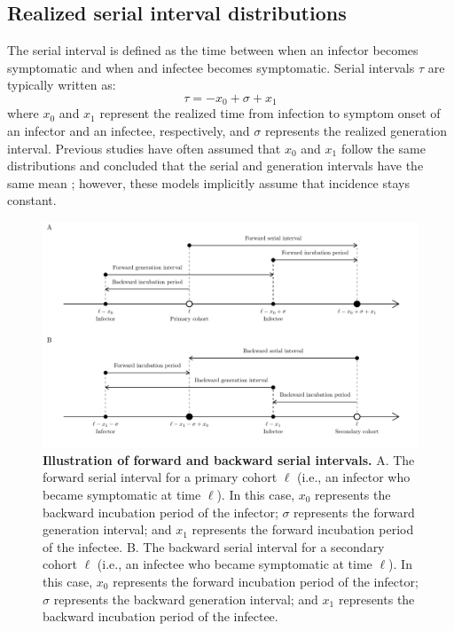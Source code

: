 \documentclass[12pt]{article}
\begin{document}
\subsection{Realized serial interval distributions}

The serial interval is defined as the time between when an infector becomes symptomatic and when and infectee becomes symptomatic.
Serial intervals $\tau$ are typically written as:
\begin{equation}
\tau = - x_0 + \sigma + x_1
\end{equation}
where $x_0$ and $x_1$ represent the realized time from infection to symptom onset of an infector and an infectee, respectively, and $\sigma$ represents the realized generation interval.
Previous studies have often assumed that $x_0$ and $x_1$ follow the same distributions and concluded that the serial and generation intervals have the same mean \citep{svensson2007note,klinkenberg2011correlation,champredon2018equivalence, britton2019estimation};
however, these models implicitly assume that incidence stays constant.

\begin{figure}[!th]
\includegraphics[width=\textwidth]{serial_guide.pdf}
\caption{
\textbf{Illustration of forward and backward serial intervals.}
A. The forward serial interval for a primary cohort $\ell$ (i.e., an infector who became symptomatic at time $\ell$).
In this case, $x_0$ represents the backward incubation period of the infector;
$\sigma$ represents the forward generation interval;
and $x_1$ represents the forward incubation period of the infectee.
B. The backward serial interval for a secondary cohort $\ell$ (i.e., an infectee who became symptomatic at time $\ell$).
In this case, $x_0$ represents the forward incubation period of the infector;
$\sigma$ represents the backward generation interval;
and $x_1$ represents the backward incubation period of the infectee.
}
\label{fig:diagram}
\end{figure}
\end{document}
